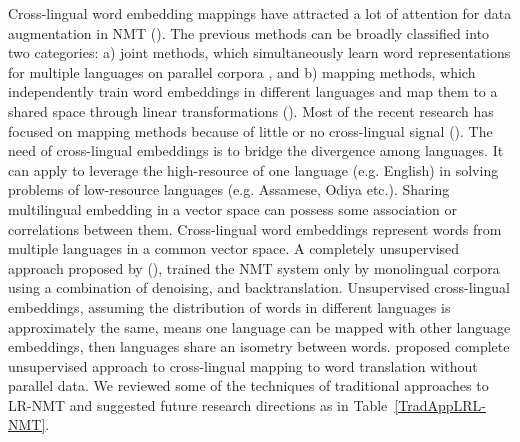 \documentclass[manuscript,screen]{acmart}
\begin{document}
Cross-lingual word embedding mappings have attracted a lot of attention for data augmentation in NMT (\citet{mi2020loanword}). The previous methods can be broadly classified into two categories: a) joint methods, which simultaneously learn word representations for multiple languages on parallel corpora \citet{luong2015bilingual}, and b) mapping methods, which independently train word embeddings in different languages and map them to a shared space through linear transformations (\citet{mikolov2013exploiting,artetxe2018generalizing}). Most of the recent research has focused on mapping methods because of little or no cross-lingual signal (\citet{zhang2017adversarial,conneau2017word,artetxe2018generalizing}). The need of cross-lingual embeddings is to bridge the divergence among languages. It can apply to leverage the high-resource of one language (e.g. English) in solving problems of low-resource languages (e.g. Assamese, Odiya etc.). Sharing multilingual embedding in a vector space can possess some association or correlations between them. Cross-lingual word embeddings represent words from multiple languages in a common vector space. A completely unsupervised approach proposed by (\citet{artetxe2017unsupervised}), trained the NMT system only by monolingual corpora using a combination of denoising, and backtranslation. Unsupervised cross-lingual embeddings, assuming the distribution of words in different languages is approximately the same, means one language can be mapped with other language embeddings, then languages share an isometry between words. \citet{conneau2017word} proposed complete unsupervised approach to cross-lingual mapping to word translation without parallel data. We reviewed some of the techniques of traditional approaches to LR-NMT and suggested future research directions as in Table~\ref{TradAppLRL-NMT}.
\end{document}
